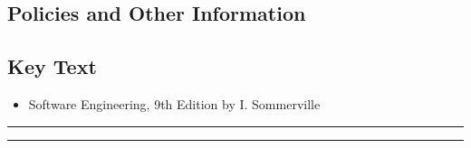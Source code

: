 

\subsection*{Policies and Other Information}
\subsection*{Key Text}
\begin{itemize}
    \item Software Engineering, 9th Edition by I. Sommerville
\end{itemize}
\vspace{2ex}\hrule
\vspace{2ex}\hrule\vspace{2ex}